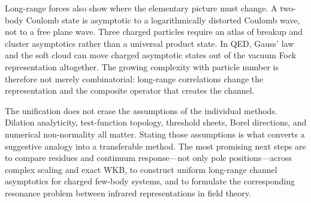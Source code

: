 Long-range forces also show where the elementary picture must change.  A
two-body Coulomb state is asymptotic to a logarithmically distorted Coulomb
wave, not to a free plane wave.  Three charged particles require an atlas of
breakup and cluster asymptotics rather than a universal product state.  In
QED, Gauss' law and the soft cloud can move charged asymptotic states out of
the vacuum Fock representation altogether.  The growing complexity with
particle number is therefore not merely combinatorial: long-range
correlations change the representation and the composite operator that
creates the channel.

The unification does not erase the assumptions of the individual methods.
Dilation analyticity, test-function topology, threshold sheets, Borel
directions, and numerical non-normality all matter.  Stating those assumptions
is what converts a suggestive analogy into a transferable method.  The most
promising next steps are to compare residues and continuum response---not only
pole positions---across complex scaling and exact WKB, to construct uniform
long-range channel asymptotics for charged few-body systems, and to formulate
the corresponding resonance problem between infrared representations in
field theory.
